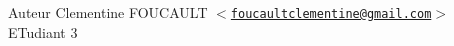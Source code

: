 \begin{DoxyAuthor}{Auteur}
Clementine F\+O\+U\+C\+A\+U\+LT $<$\href{mailto:foucaultclementine@gmail.com}{\tt foucaultclementine@gmail.\+com}$>$ E\+Tudiant 3 
\end{DoxyAuthor}
